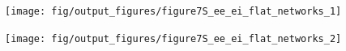 \documentclass[a4paper,12pt]{article}
\begin{document}
{\clearpage

\begin{figure}[p!]
    \internallinenumbers
    \centering
        \texttt{[image: fig/output\_figures/figure7S\_ee\_ei\_flat\_networks\_1]}
\end{figure}

\begin{figure}[p!]
    \internallinenumbers
    \centering
        \texttt{[image: fig/output\_figures/figure7S\_ee\_ei\_flat\_networks\_2]}
    \caption{}
\end{figure}

}  %
\end{document}

